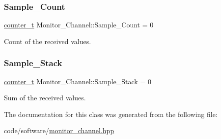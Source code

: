 \subsubsection{\texorpdfstring{Sample\+\_\+\+Count}{Sample\_Count}}
{\footnotesize\ttfamily \hyperlink{types_8hpp_a22f279793847eba127de149437848c48}{counter\+\_\+t} Monitor\+\_\+\+Channel\+::\+Sample\+\_\+\+Count = 0}



Count of the received values. 

\mbox{\label{classMonitor__Channel_a5523d9f38c2910b4014e93d18a9267cd}} 
\subsubsection{\texorpdfstring{Sample\+\_\+\+Stack}{Sample\_Stack}}
{\footnotesize\ttfamily \hyperlink{types_8hpp_a22f279793847eba127de149437848c48}{counter\+\_\+t} Monitor\+\_\+\+Channel\+::\+Sample\+\_\+\+Stack = 0}



Sum of the received values. 



The documentation for this class was generated from the following file\+:\begin{DoxyCompactItemize}
\item 
code/software/\hyperlink{monitor__channel_8hpp}{monitor\+\_\+channel.\+hpp}\end{DoxyCompactItemize}
